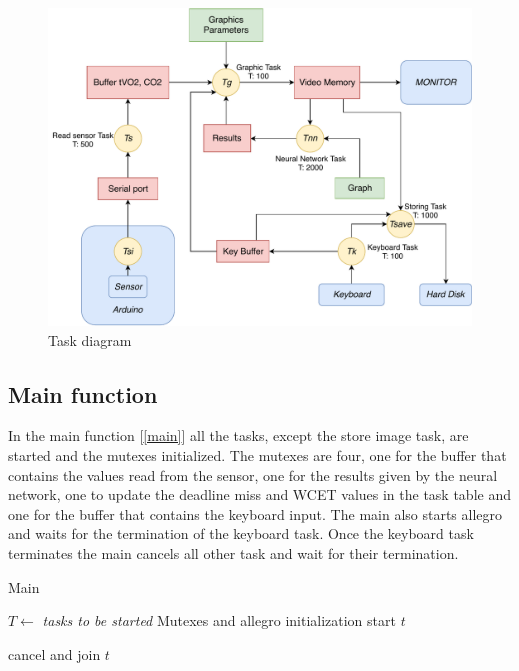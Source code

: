 \documentclass[12pt]{article}
\begin{document}
\begin{figure}[H]
    \includegraphics[width=\textwidth]{diagram.pdf}
    \caption{Task diagram}
    \label{tdiagram}
\end{figure}

\subsection{Main function}
In the main function [\ref{main}] all the tasks, except the store image task,
are started and the mutexes initialized. The mutexes are four, one for the
buffer that contains the values read from the sensor, one for the results
given by the neural network, one to update the deadline miss and WCET values
in the task table and one for the buffer that contains the keyboard input. The
main also starts allegro and waits for the termination of the keyboard task.
Once the keyboard task terminates the main cancels all other task and wait
for their termination.

\begin{algorithm}[H]
\caption{Main}
\label{main}

\begin{algorithmic}
\State $T\gets$ \textit{tasks to be started}
\State Mutexes and allegro initialization
    \State start $t$
\EndFor

\Repeat
{}

    \State cancel and join $t$
\EndFor

\end{algorithmic}
\end{algorithm}
\end{document}
